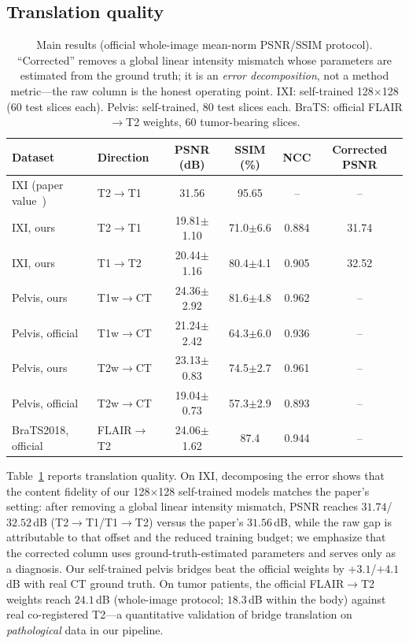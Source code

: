 \documentclass[11pt]{article}
\begin{document}
\subsection{Translation quality}
\begin{table}[t]
\centering\small
\caption{Main results (official whole-image mean-norm PSNR/SSIM protocol).
``Corrected'' removes a global linear intensity mismatch whose parameters are
estimated from the ground truth; it is an \emph{error decomposition}, not a
method metric---the raw column is the honest operating point. IXI:
self-trained 128$\times$128 (60 test slices each). Pelvis: self-trained,
80 test slices each.
BraTS: official FLAIR$\to$T2 weights, 60 tumor-bearing slices.}
\label{tab:main}
\begin{tabular}{llcccc}
\toprule
Dataset & Direction & PSNR (dB) & SSIM (\%) & NCC & Corrected PSNR \\
\midrule
IXI (paper value~\cite{arslan2025selfrdb}) & T2$\to$T1 & 31.56 & 95.65 & -- & -- \\
IXI, ours & T2$\to$T1 & 19.81$\pm$1.10 & 71.0$\pm$6.6 & 0.884 & 31.74 \\
IXI, ours & T1$\to$T2 & 20.44$\pm$1.16 & 80.4$\pm$4.1 & 0.905 & 32.52 \\
Pelvis, ours & T1w$\to$CT & 24.36$\pm$2.92 & 81.6$\pm$4.8 & 0.962 & -- \\
Pelvis, official & T1w$\to$CT & 21.24$\pm$2.42 & 64.3$\pm$6.0 & 0.936 & -- \\
Pelvis, ours & T2w$\to$CT & 23.13$\pm$0.83 & 74.5$\pm$2.7 & 0.961 & -- \\
Pelvis, official & T2w$\to$CT & 19.04$\pm$0.73 & 57.3$\pm$2.9 & 0.893 & -- \\
BraTS2018, official & FLAIR$\to$T2 & 24.06$\pm$1.62 & 87.4 & 0.944 & -- \\
\bottomrule
\end{tabular}
\end{table}

Table~\ref{tab:main} reports translation quality. On IXI, decomposing the
error shows that the content fidelity of our 128$\times$128 self-trained
models matches the paper's setting: after removing a global linear intensity
mismatch, PSNR reaches $31.74$/$32.52$\,dB (T2$\to$T1/T1$\to$T2) versus the
paper's $31.56$\,dB, while the raw gap is attributable to that offset and the
reduced training budget; we emphasize that the corrected column uses
ground-truth-estimated parameters and serves only as a diagnosis. Our
self-trained pelvis bridges beat the official weights by $+3.1$/$+4.1$\,dB
with real CT ground truth. On tumor patients, the official FLAIR$\to$T2
weights reach $24.1$\,dB (whole-image protocol; $18.3$\,dB within the body)
against real co-registered T2---a quantitative validation of bridge
translation on \emph{pathological} data in our pipeline.
\end{document}

